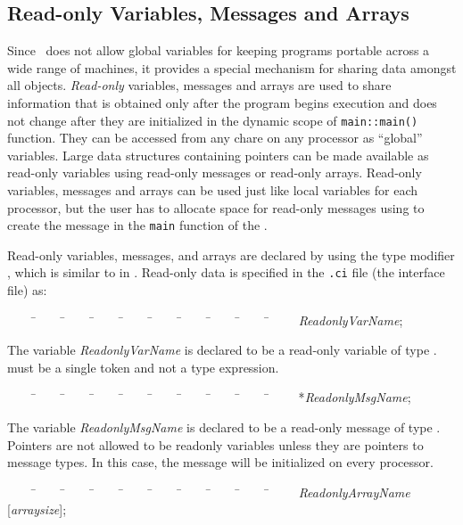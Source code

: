 \subsection{Read-only Variables, Messages and Arrays}

Since \charmpp\ does not allow global variables for keeping
programs portable across a wide range of machines, it provides a special
mechanism for sharing data amongst all objects. {\it Read-only}
variables, messages and arrays are used to share information that 
is obtained only after the program begins execution and does not
change after they are initialized in the dynamic scope of 
{\tt main::main()} function. They
can be accessed from any chare on any processor as ``global''
variables. Large data structures containing pointers can be made
available as read-only variables using read-only messages or
read-only arrays. Read-only variables, messages and arrays can
be used just like local variables for each processor, but the user has
to allocate space for read-only messages using  to create
the message in the {\tt main} function of the . 

Read-only variables, messages, and arrays are declared by using the type
modifier , which is similar to  in
\CC. Read-only data is specified in the {\tt .ci} file (the interface
file) as: 

\begin{tabbing}
~~~~ \=~~~~ \=~~~~ \=~~~~ \=~~~~ \=~~~~ \=~~~~ \=~~~~ \=~~~~ \=~~~~ \kill
\>   {\it ReadonlyVarName};
\end{tabbing}

The variable {\it ReadonlyVarName} is declared to be a read-only
variable of type .  must be a single token and not a
type expression.

\begin{tabbing}
~~~~ \=~~~~ \=~~~~ \=~~~~ \=~~~~ \=~~~~ \=~~~~ \=~~~~ \=~~~~ \=~~~~ \kill
\>   *{\it ReadonlyMsgName};
\end{tabbing}

The variable {\it ReadonlyMsgName} is declared to be a read-only
message of type . Pointers are not allowed to be
readonly variables unless they are pointers to message types. In this
case, the message will be initialized on every processor.

\begin{tabbing}
~~~~ \=~~~~ \=~~~~ \=~~~~ \=~~~~ \=~~~~ \=~~~~ \=~~~~ \=~~~~ \=~~~~ \kill
\>   {\it ReadonlyArrayName} [{\it arraysize}];
\end{tabbing}

